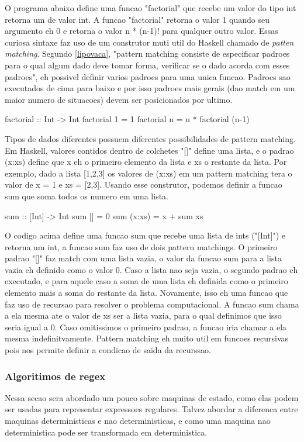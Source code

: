 O programa abaixo define uma funcao "factorial" que recebe um valor do tipo int retorna um de valor int.
A funcao "factorial" retorna o valor 1 quando seu argumento eh 0 e retorna o valor n * (n-1)! para qualquer outro valor.
Essas curiosa sintaxe faz uso de um construtor muti util do Haskell chamado de \emph{patten matching}.
Segundo \ref{lipovaca}, "pattern matching consiste de especificar padroes para o qual algum dado deve tomar forma, verificar se o dado acorda com esses padroes", eh possivel definir varios padroes para uma unica funcao.
Padroes sao executados de cima para baixo e por isso padroes mais gerais (dao match em um maior numero de situacoes) devem ser posicionados por ultimo.

factorial :: Int -> Int
factorial 1 = 1
factorial n = n * factorial (n-1)

Tipos de dados diferentes possuem diferentes possibilidades de pattern matching.
Em Haskell, valores contidos dentro de colchetes "[]" define uma lista, e o padrao (x:xs) define que x eh o primeiro elemento da lista e xs o restante da lista.
Por exemplo, dado a lista [1,2,3] os valores de (x:xs) em um pattern matching tera o valor de x = 1 e xs = [2,3].
Usando esse construtor, podemos definir a funcao sum que soma todos os numero em uma lista.

sum :: [Int] -> Int
sum [] = 0
sum (x:xs) = x + sum xs

O codigo acima define uma funcao sum que recebe uma lista de ints ("[Int]") e retorna um int, a funcao sum faz uso de dois pattern matchings.
O primeiro padrao "[]" faz match com uma lista vazia, o valor da funcao sum para a lista vazia eh definido como o valor 0.
Caso a lista nao seja vazia, o segundo padrao eh executado, e para aquele caso a soma de uma lista eh definida como o primeiro elemento mais a soma do restante da lista.
Novamente, isso eh uma funcao que faz uso de recursao para resolver o problema computacional.
A funcao sum chama a ela mesma ate o valor de xs ser a lista vazia, para o qual definimos que isso seria igual a $0$.
Caso omitissimos o primeiro padrao, a funcao iria chamar a ela mesma indefinitvamente.
Pattern matching eh muito util em funcoes recursivas pois nos permite definir a condicao de saida da recurssao.

\subsubsection{Algoritimos de regex}

Nessa secao sera abordado um pouco sobre maquinas de estado, como elas podem ser usadas para representar expressoes regulares.
Talvez abordar a diferenca entre maquinas deterministicas e nao deterministicas, e como uma maquina nao deterministica pode ser transformada em deterministica.

